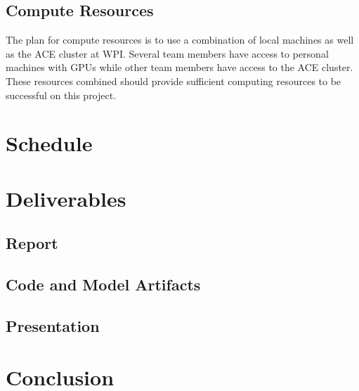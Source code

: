 \documentclass[conference]{IEEEtran}
\begin{document}
\subsection{Compute Resources}
The plan for compute resources is to use a combination of local machines as well as the ACE cluster at WPI.
Several team members have access to personal machines with GPUs while other team members have access to the ACE cluster.
These resources combined should provide sufficient computing resources to be successful on this project.

\section{Schedule}

\section{Deliverables}

\subsection{Report}

\subsection{Code and Model Artifacts}

\subsection{Presentation}

\section{Conclusion}

{}


\vspace{12pt}
\end{document}
